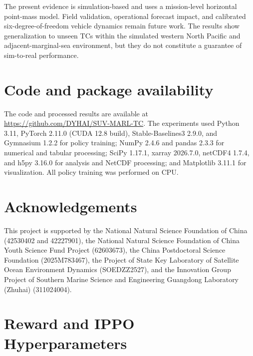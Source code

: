 \documentclass[a4paper,fleqn]{cas-dc}
\begin{document}
The present evidence is simulation-based and uses a mission-level horizontal
point-mass model. Field validation, operational forecast impact, and calibrated
six-degree-of-freedom vehicle dynamics remain future work. The results show
generalization to unseen TCs within the simulated western North Pacific and
adjacent-marginal-sea environment, but they do not constitute a guarantee of
sim-to-real performance.

\section*{Code and package availability}
\begin{sloppypar}
The code and processed results are available at\newline
\url{https://github.com/DYHAI/SUV-MARL-TC}. The experiments used Python 3.11,
PyTorch 2.11.0 (CUDA 12.8 build), Stable-Baselines3 2.9.0, and Gymnasium
1.2.2 for policy training; NumPy 2.4.6 and pandas 2.3.3 for numerical and
tabular processing; SciPy 1.17.1, xarray 2026.7.0, netCDF4 1.7.4, and h5py
3.16.0 for analysis and NetCDF processing; and Matplotlib 3.11.1 for
visualization. All policy training was performed on CPU.
\end{sloppypar}

\section*{Acknowledgements}
\begin{sloppypar}
This project is supported by the National Natural Science Foundation of China
(42530402 and 42227901), the National Natural Science Foundation of China
Youth Science Fund Project (62603673), the China Postdoctoral Science
Foundation (2025M783467), the Project of State Key Laboratory of Satellite
Ocean Environment Dynamics (SOEDZZ2527), and the Innovation Group Project of
Southern Marine Science and Engineering Guangdong Laboratory (Zhuhai)
(311024004).
\end{sloppypar}

\printcredits

\clearpage
\appendix
\onecolumn

\section{Reward and IPPO Hyperparameters}\label{app:parameters}

\setcounter{table}{0}
\renewcommand{\thetable}{A.\arabic{table}}
\end{document}
